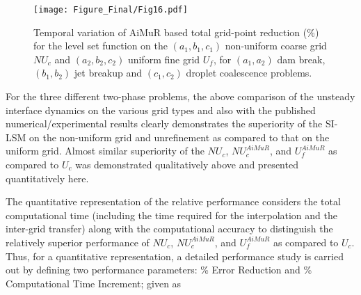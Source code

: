 \documentclass[preprint,12pt]{elsarticle}
\newcommand{\review}[1]{\color{black}#1}
\begin{document}
\begin{figure}
\begin{centering}
\texttt{[image: Figure\_Final/Fig16.pdf]}

\par\end{centering}



\protect\caption{\label{fig:Temporal-variation-of-1}\review{Temporal variation of AiMuR based
total grid-point reduction (\%) for the level set function on the $(a_1,b_1,c_1)$ non-uniform coarse grid $NU_{c}$ and $(a_2,b_2,c_2)$ uniform fine grid $U_{f}$, for $(a_1,a_2)$ dam break, $(b_1,b_2)$ jet breakup and $(c_1,c_2)$ droplet coalescence problems.}}
\end{figure}

For the three different two-phase problems, the above comparison of the unsteady interface dynamics on the various grid types and also with the published numerical/experimental results clearly demonstrates the superiority of the SI-LSM on the non-uniform grid and unrefinement as compared to that on the uniform grid. Almost similar superiority of the $NU_{c}$, $NU_{c}^{AiMuR}$,
and $U_{f}^{AiMuR}$ as compared to $U_{c}$ was demonstrated qualitatively above and presented quantitatively here.

The quantitative representation of the relative performance considers the \review{total} computational time \review{(including the time required for the interpolation and the inter-grid transfer)} along with the computational accuracy to distinguish the relatively superior performance of $NU_{c}$, $NU_{c}^{AiMuR}$,
and $U_{f}^{AiMuR}$ as compared to $U_{c}$. Thus,
for a quantitative representation, a detailed performance study is carried out by defining two performance parameters: \% Error
Reduction and \% Computational Time Increment; given as \review{ \cite{gada2011,Lakdawala2015,Patil2016,shaikh2019}}
\end{document}
